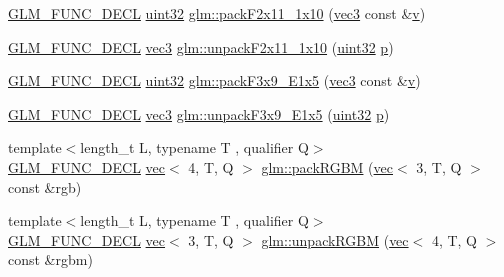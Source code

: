 \begin{DoxyCompactItemize}
\mbox{\hyperlink{setup_8hpp_ab2d052de21a70539923e9bcbf6e83a51}{G\+L\+M\+\_\+\+F\+U\+N\+C\+\_\+\+D\+E\+CL}} \mbox{\hyperlink{group__gtc__type__precision_ga202b6a53c105fcb7e531f9b443518451}{uint32}} \mbox{\hyperlink{group__gtc__packing_ga8c2a0eeee677ca4dafd9e093d9e81062}{glm\+::pack\+F2x11\+\_\+1x10}} (\mbox{\hyperlink{group__core__types_ga1c47e8b3386109bc992b6c48e91b0be7}{vec3}} const \&\mbox{\hyperlink{_s_d_l__opengl_8h_a10a82eabcb59d2fcd74acee063775f90}{v}})
\item 
\mbox{\hyperlink{setup_8hpp_ab2d052de21a70539923e9bcbf6e83a51}{G\+L\+M\+\_\+\+F\+U\+N\+C\+\_\+\+D\+E\+CL}} \mbox{\hyperlink{group__core__types_ga1c47e8b3386109bc992b6c48e91b0be7}{vec3}} \mbox{\hyperlink{group__gtc__packing_ga8b9c7991eb021d95c778bf5c0b2f7824}{glm\+::unpack\+F2x11\+\_\+1x10}} (\mbox{\hyperlink{group__gtc__type__precision_ga202b6a53c105fcb7e531f9b443518451}{uint32}} \mbox{\hyperlink{_s_d_l__opengl__glext_8h_aa5367c14d90f462230c2611b81b41d23}{p}})
\item 
\mbox{\hyperlink{setup_8hpp_ab2d052de21a70539923e9bcbf6e83a51}{G\+L\+M\+\_\+\+F\+U\+N\+C\+\_\+\+D\+E\+CL}} \mbox{\hyperlink{group__gtc__type__precision_ga202b6a53c105fcb7e531f9b443518451}{uint32}} \mbox{\hyperlink{group__gtc__packing_ga0984f9598edc648d59a9643d9a61b121}{glm\+::pack\+F3x9\+\_\+\+E1x5}} (\mbox{\hyperlink{group__core__types_ga1c47e8b3386109bc992b6c48e91b0be7}{vec3}} const \&\mbox{\hyperlink{_s_d_l__opengl_8h_a10a82eabcb59d2fcd74acee063775f90}{v}})
\item 
\mbox{\hyperlink{setup_8hpp_ab2d052de21a70539923e9bcbf6e83a51}{G\+L\+M\+\_\+\+F\+U\+N\+C\+\_\+\+D\+E\+CL}} \mbox{\hyperlink{group__core__types_ga1c47e8b3386109bc992b6c48e91b0be7}{vec3}} \mbox{\hyperlink{group__gtc__packing_ga15d8845a31e1e55d493803d0c8cb5910}{glm\+::unpack\+F3x9\+\_\+\+E1x5}} (\mbox{\hyperlink{group__gtc__type__precision_ga202b6a53c105fcb7e531f9b443518451}{uint32}} \mbox{\hyperlink{_s_d_l__opengl__glext_8h_aa5367c14d90f462230c2611b81b41d23}{p}})
\item 
{\footnotesize template$<$length\+\_\+t L, typename T , qualifier Q$>$ }\\\mbox{\hyperlink{setup_8hpp_ab2d052de21a70539923e9bcbf6e83a51}{G\+L\+M\+\_\+\+F\+U\+N\+C\+\_\+\+D\+E\+CL}} \mbox{\hyperlink{structglm_1_1vec}{vec}}$<$ 4, T, Q $>$ \mbox{\hyperlink{group__gtc__packing_ga0466daf4c90f76cc64b3f105ce727295}{glm\+::pack\+R\+G\+BM}} (\mbox{\hyperlink{structglm_1_1vec}{vec}}$<$ 3, T, Q $>$ const \&rgb)
\item 
{\footnotesize template$<$length\+\_\+t L, typename T , qualifier Q$>$ }\\\mbox{\hyperlink{setup_8hpp_ab2d052de21a70539923e9bcbf6e83a51}{G\+L\+M\+\_\+\+F\+U\+N\+C\+\_\+\+D\+E\+CL}} \mbox{\hyperlink{structglm_1_1vec}{vec}}$<$ 3, T, Q $>$ \mbox{\hyperlink{group__gtc__packing_ga5c1ec97894b05ea21a05aea4f0204a02}{glm\+::unpack\+R\+G\+BM}} (\mbox{\hyperlink{structglm_1_1vec}{vec}}$<$ 4, T, Q $>$ const \&rgbm)

\end{DoxyCompactItemize}
